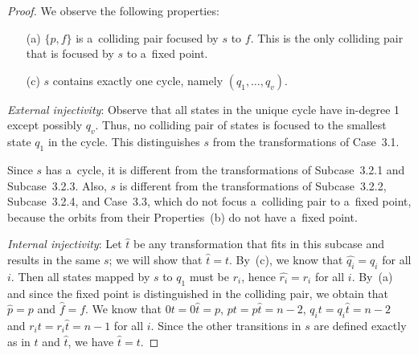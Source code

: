 \documentclass{amsart}
\newcommand{\e}[1]{\hat{#1}}
\begin{document}
\begin{proof}
We observe the following properties:
\begin{enumerate}
\item[(a)] $\{p,f\}$ is a~colliding pair focused by $s$ to $f$.
This is the only colliding pair that is focused by $s$ to a~fixed point.

\item[(c)] $s$ contains exactly one cycle, namely $(q_1,\ldots,q_v)$.
\end{enumerate}

\textit{External injectivity}:
Observe that all states in the unique cycle have in-degree 1 except possibly $q_v$.
Thus, no colliding pair of states is focused to the smallest state $q_1$ in the cycle.
This distinguishes $s$ from the transformations of Case~3.1.

Since $s$ has a~cycle, it is different from the transformations of Subcase~3.2.1 and Subcase~3.2.3.
Also, $s$ is different from the transformations of Subcase~3.2.2, Subcase~3.2.4, and Case~3.3, which do not focus a~colliding pair to a~fixed point, because the orbits from their Properties~(b) do not have a~fixed point.

\textit{Internal injectivity}:
Let $\e{t}$ be any transformation that fits in this subcase and results in the same $s$; we will show that $\e{t}=t$.
By~(c), we know that $\e{q_i} = q_i$ for all $i$.
Then all states mapped by $s$ to $q_1$ must be $r_i$, hence $\e{r_i} = r_i$ for all $i$.
By~(a) and since the fixed point is distinguished in the colliding pair, we obtain that $\e{p} = p$ and $\e{f} = f$.
We know that $0t = 0\e{t} = p$, $pt = p\e{t} = n-2$, $q_i t = q_i \e{t} = n-2$ and $r_i t = r_i \e{t} = n-1$ for all $i$.
Since the other transitions in $s$ are defined exactly as in $t$ and $\e{t}$, we have $\e{t} = t$.


\end{proof}
\end{document}
